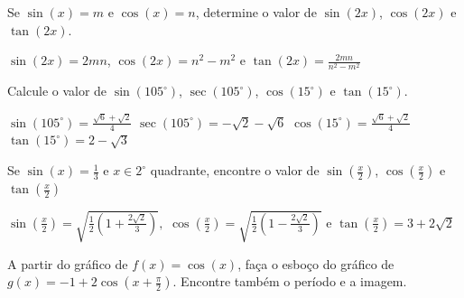 \begin{exercises*}
\begin{exercise}
  Se $\sin(x) = m$ e $\cos(x) = n$, determine o valor de $\sin(2x)$,
  $\cos(2x)$ e $\tan(2x)$.

  \begin{answer}
    $\sin(2x)=2mn$, $\cos(2x)=n^2-m^2$ e $\tan(2x)=\frac{2mn}{n^2-m^2}$
  \end{answer}
\end{exercise}

\begin{exercise}
  Calcule o valor de $\sin(105^{\circ})$, $\sec(105^{\circ})$,
  $\cos(15^{\circ})$ e $\tan(15^{\circ})$.

  \begin{answer}
    $\sin(105^{\circ}) = \frac{\sqrt{6}+\sqrt{2}}{4}$
    $\sec(105^{\circ}) = -\sqrt{2}-\sqrt{6}$
    $\cos(15^{\circ}) = \frac{\sqrt{6}+\sqrt{2}}{4}$
    $\tan(15^{\circ}) = 2-\sqrt{3}$
  \end{answer}
\end{exercise}

\begin{exercise}
  Se $\sin(x)= \frac{1}{3}$ e $x \in 2^{\circ}$ quadrante, encontre o
  valor de $\sin(\frac{x}{2})$, $\cos(\frac{x}{2})$ e $\tan(\frac{x}{2})$

  \begin{answer}
     $\sin\left(
     \frac{x}{2}\right)=\sqrt{\frac{1}{2}\left(1+\frac{2\sqrt{2}}{3} \right)},
     \,\, \cos\left(
     \frac{x}{2}\right)=\sqrt{\frac{1}{2}\left(1-\frac{2\sqrt{2}}{3} \right)}$ e
     $\tan\left( \frac{x}{2}\right)=3+2\sqrt{2}$
  \end{answer}
\end{exercise}

\begin{exercise}
  A partir do gráfico de $f(x)= \cos(x)$, faça o esboço do gráfico de
  $g(x)=-1+ 2 \cos(x+ \frac{\pi}{2})$. Encontre também o período e a
  imagem.

  \begin{answer}
  \end{answer}
\end{exercise}


\end{exercises*}
